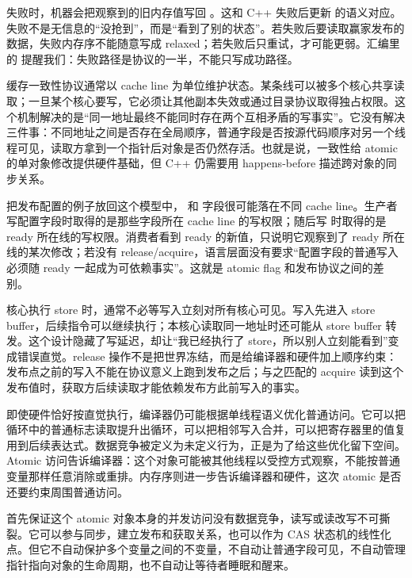  失败时，机器会把观察到的旧内存值写回 。这和 C++  失败后更新  的语义对应。失败不是无信息的“没抢到”，而是“看到了别的状态”。若失败后要读取赢家发布的数据，失败内存序不能随意写成 relaxed；若失败后只重试，才可能更弱。汇编里的  提醒我们：失败路径是协议的一半，不能只写成功路径。

缓存一致性协议通常以 cache line 为单位维护状态。某条线可以被多个核心共享读取；一旦某个核心要写，它必须让其他副本失效或通过目录协议取得独占权限。这个机制解决的是“同一地址最终不能同时存在两个互相矛盾的写事实”。它没有解决三件事：不同地址之间是否存在全局顺序，普通字段是否按源代码顺序对另一个线程可见，读取方拿到一个指针后对象是否仍然存活。也就是说，一致性给 atomic 的单对象修改提供硬件基础，但 C++ 仍需要用 happens-before 描述跨对象的同步关系。

把发布配置的例子放回这个模型中， 和  字段很可能落在不同 cache line。生产者写配置字段时取得的是那些字段所在 cache line 的写权限；随后写  时取得的是 ready 所在线的写权限。消费者看到 ready 的新值，只说明它观察到了 ready 所在线的某次修改；若没有 release/acquire，语言层面没有要求“配置字段的普通写入必须随 ready 一起成为可依赖事实”。这就是 atomic flag 和发布协议之间的差别。

核心执行 store 时，通常不必等写入立刻对所有核心可见。写入先进入 store buffer，后续指令可以继续执行；本核心读取同一地址时还可能从 store buffer 转发。这个设计隐藏了写延迟，却让“我已经执行了 store，所以别人立刻能看到”变成错误直觉。release 操作不是把世界冻结，而是给编译器和硬件加上顺序约束：发布点之前的写入不能在协议意义上跑到发布之后；与之匹配的 acquire 读到这个发布值时，获取方后续读取才能依赖发布方此前写入的事实。

即使硬件恰好按直觉执行，编译器仍可能根据单线程语义优化普通访问。它可以把循环中的普通标志读取提升出循环，可以把相邻写入合并，可以把寄存器里的值复用到后续表达式。数据竞争被定义为未定义行为，正是为了给这些优化留下空间。Atomic 访问告诉编译器：这个对象可能被其他线程以受控方式观察，不能按普通变量那样任意消除或重排。内存序则进一步告诉编译器和硬件，这次 atomic 是否还要约束周围普通访问。

 首先保证这个 atomic 对象本身的并发访问没有数据竞争，读写或读改写不可撕裂。它可以参与同步，建立发布和获取关系，也可以作为 CAS 状态机的线性化点。但它不自动保护多个变量之间的不变量，不自动让普通字段可见，不自动管理指针指向对象的生命周期，也不自动让等待者睡眠和醒来。

